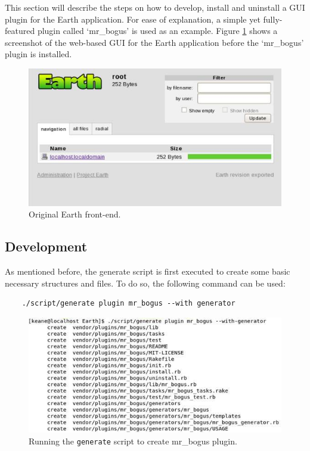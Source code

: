 \documentclass{article}
\begin{document}
This section will describe the steps on how to develop, install and uninstall a GUI plugin for the Earth application. For ease of explanation, a simple yet fully-featured plugin called `mr\_bogus' is used as an example. Figure \ref{fig:instruction-1} shows a screenshot of the web-based GUI for the Earth application before the `mr\_bogus' plugin is installed.

\begin{figure}
\begin{centering}
\includegraphics[width=150mm]{fig/instruction-1}
\end{centering}
\caption{Original Earth front-end.}
\label{fig:instruction-1}
\end{figure}


\subsection{Development} %

As mentioned before, the generate script is first executed to create some basic necessary structures and files. To do so, the following command can be used:

\begin{verbatim}
    ./script/generate plugin mr_bogus --with generator
\end{verbatim}

\begin{figure}
\begin{centering}    
\includegraphics[width=140mm]{fig/instruction-2}
\end{centering}
\caption{Running the \texttt{generate} script to create mr\_bogus plugin.}
\label{fig:instruction-2}
\end{figure}
\end{document}
